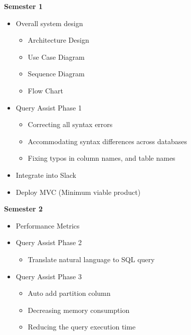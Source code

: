 \textbf{Semester 1}
\begin{itemize}
    \item  Overall system design
    \begin{itemize}
        \item Architecture Design
        \item Use Case Diagram
        \item Sequence Diagram
        \item Flow Chart
    \end{itemize}

    \item  Query Assist Phase 1
    \begin{itemize}
        \item Correcting all syntax errors
        \item Accommodating syntax differences across databases
        \item Fixing typos in column names, and table names
    \end{itemize}

    \item  Integrate into Slack
    \item Deploy MVC (Minimum viable product)
\end{itemize}
\textbf{Semester 2}
\begin{itemize}
    \item  Performance Metrics

    \item  Query Assist Phase 2
    \begin{itemize}
        \item Translate natural language to SQL query
    \end{itemize}

    \item Query Assist Phase 3
    \begin{itemize}
        \item Auto add partition column
        \item Decreasing memory consumption
        \item Reducing the query execution time
    \end{itemize}
\end{itemize}
\pagebreak
